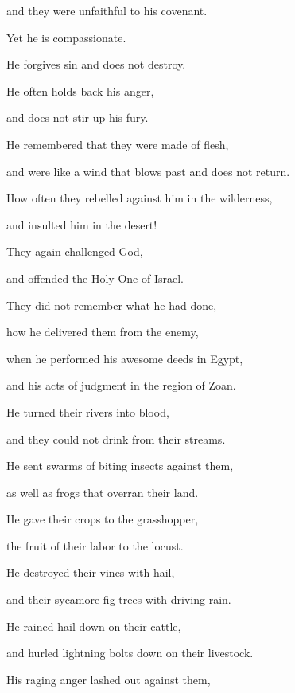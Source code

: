 {\par }{\Q and they were unfaithful
to his covenant.
\par }{\Q {}Yet he is
compassionate.
\par }{\Q He forgives
sin
and does not
destroy.
\par }{\Q He often
holds back
his anger,
\par }{\Q and does not
stir
up his fury.
\par }{\Q {}He remembered
that
they were
made of flesh,
\par }{\Q and were
like a wind
that blows
past and does not
return.
\par }{\Q {}How
often they rebelled
against him in the wilderness,
\par }{\Q and insulted
him in the desert!
\par }{\Q {}They again
challenged
God,
\par }{\Q and offended
the Holy One
of Israel.
\par }{\Q {}They did not
remember
what he had
done,

\par }{\Q how he delivered
them from
the enemy,
\par }{\Q {}when
he performed
his awesome
deeds in Egypt,
\par }{\Q and his acts of judgment
in the region
of Zoan.
\par }{\Q {}He turned
their rivers
into blood,
\par }{\Q and they could
not drink
from their streams.
\par }{\Q {}He sent
swarms
of biting
insects against them,

\par }{\Q as well as frogs
that overran their land.
\par }{\Q {}He gave
their crops
to the grasshopper,
\par }{\Q the fruit of their labor
to the locust.
\par }{\Q {}He destroyed
their vines
with hail,
\par }{\Q and their sycamore-fig trees
with driving rain.
\par }{\Q {}He rained
hail
down
on their cattle,
\par }{\Q and hurled lightning bolts
down on their livestock.
\par }{\Q {}His raging
anger
lashed out
against them,

}
